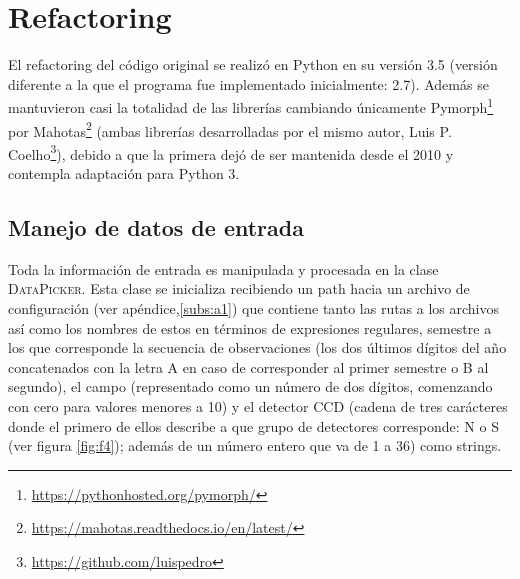 \chapter{Refactoring}
\label{ch:refactoring}
El refactoring del c\'odigo original se realiz\'o en Python en su versi\'on 3.5 (versi\'on diferente a la que el programa fue implementado inicialmente: 2.7). Adem\'as se mantuvieron casi la totalidad de las librer\'ias cambiando \'unicamente Pymorph\footnote{\url{https://pythonhosted.org/pymorph/}} por Mahotas\footnote{\url{https://mahotas.readthedocs.io/en/latest/}} (ambas librer\'ias desarrolladas por el mismo autor, Luis P. Coelho\footnote{\url{https://github.com/luispedro}}), debido a que la primera dej\'o de ser mantenida desde el 2010 y contempla adaptaci\'on para Python 3.   

\section{Manejo de datos de entrada}
Toda la informaci\'on de entrada es manipulada y procesada en la clase \textsc{DataPicker}. Esta clase se inicializa recibiendo un path hacia un archivo de configuraci\'on (ver ap\'endice,\ref{subs:a1}) que contiene tanto las rutas a los archivos as\'i como los nombres de estos en t\'erminos de expresiones regulares, semestre a los que corresponde la secuencia de observaciones (los dos \'ultimos d\'igitos del a\~no concatenados con la letra A en caso de corresponder al primer semestre o B al segundo), el campo (representado como un n\'umero de dos d\'igitos, comenzando con cero para valores menores a 10) y el detector CCD (cadena de tres car\'acteres donde el primero de ellos describe a que grupo de detectores corresponde: N o S (ver figura \ref{fig:f4}); adem\'as de un n\'umero entero que va de 1 a 36) como strings. 
\bigskip

